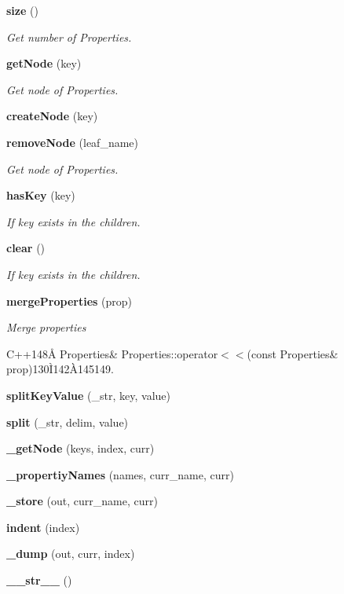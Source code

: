 \begin{CompactItemize}
{\bf size} ()
\begin{CompactList}\small\item\em Get number of Properties. \item\end{CompactList}\item 
{\bf get\-Node} (key)
\begin{CompactList}\small\item\em Get node of Properties. \item\end{CompactList}\item 
{\bf create\-Node} (key)
\item 
{\bf remove\-Node} (leaf\_\-name)
\begin{CompactList}\small\item\em Get node of Properties. \item\end{CompactList}\item 
{\bf has\-Key} (key)
\begin{CompactList}\small\item\em If key exists in the children. \item\end{CompactList}\item 
{\bf clear} ()
\begin{CompactList}\small\item\em If key exists in the children. \item\end{CompactList}\item 
{\bf merge\-Properties} (prop)
\begin{CompactList}\small\item\em Merge properties

C++148\AA{} Properties\& Properties::operator$<$$<$(const Properties\& prop)130\`{I}142\`{A}145149. \item\end{CompactList}\item 
{\bf split\-Key\-Value} (\_\-str, key, value)
\item 
{\bf split} (\_\-str, delim, value)
\item 
{\bf \_\-get\-Node} (keys, index, curr)
\item 
{\bf \_\-propertiy\-Names} (names, curr\_\-name, curr)
\item 
{\bf \_\-store} (out, curr\_\-name, curr)
\item 
{\bf indent} (index)
\item 
{\bf \_\-dump} (out, curr, index)
\item 
{\bf \_\-\_\-str\_\-\_\-} ()
\end{CompactItemize}


